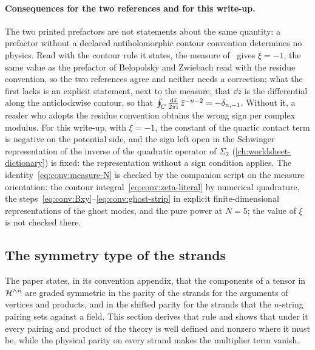 \paragraph{Consequences for the two references and for this write-up.}
The two printed prefactors are not statements about the same quantity: a prefactor without a declared antiholomorphic contour convention determines no physics.
Read with the contour rule it states, the measure of~\cite{Erbin:2021:StringFieldTheory} gives $\xi = -1$, the same value as the prefactor of Belopolsky and Zwiebach read with the residue convention, so the two references agree and neither needs a correction; what the first lacks is an explicit statement, next to the measure, that $\dd \bar z$ is the differential along the anticlockwise contour, so that $\oint_C \frac{\mathrm{d} \bar z}{2\pi \mathrm{i}} \, \bar z^{-n-2} = - \delta_{n,-1}$.
Without it, a reader who adopts the residue convention obtains the wrong sign per complex modulus.
For this write-up, with $\xi = -1$, the constant of the quartic contact term is negative on the potential side, and the sign left open in the Schwinger representation of the inverse of the quadratic operator of $\Sigma_2$ (\cref{ch:worldsheet-dictionary}) is fixed: the representation without a sign condition applies.
The identity~\eqref{eq:conv:measure-N} is checked by the companion script on the measure orientation: the contour integral~\eqref{eq:conv:zeta-literal} by numerical quadrature, the steps~\eqref{eq:conv:Bxy}--\eqref{eq:conv:ghost-strip} in explicit finite-dimensional representations of the ghost modes, and the pure power at $N = 5$; the value of $\xi$ is not checked there.


\subsection{The symmetry type of the strands}
\label{sec:conv:strands}


The paper states, in its convention appendix, that the components of a tensor in $\mathcal{H}^{\wedge n}$ are graded symmetric in the parity of the strands for the arguments of vertices and products, and in the shifted parity for the strands that the $n$-string pairing sets against a field.
This section derives that rule and shows that under it every pairing and product of the theory is well defined and nonzero where it must be, while the physical parity on every strand makes the multiplier term vanish.

